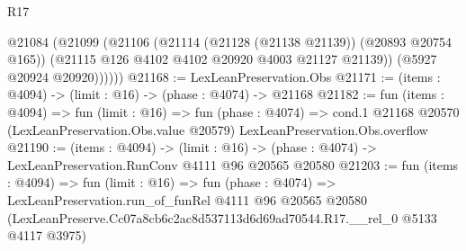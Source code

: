 \begin{lexlean}{R17}
\begin{coremodule}
          @21084
            (@21099
              (@21106
                (@21114 (@21128 (@21138 @21139)) (@20893 @20754 @165))
                (@21115 @126 @4102 @4102 @20920 @4003 @21127 @21139))
              (@5927 @20924 @20920))))))
@21168 := LexLeanPreservation.Obs
@21171 := (items : @4094) -> (limit : @16) -> (phase : @4074) -> @21168
@21182 := fun (items : @4094) =>
  fun (limit : @16) =>
  fun (phase : @4074) =>
  cond.{1} @21168 @20570 (LexLeanPreservation.Obs.value @20579) LexLeanPreservation.Obs.overflow
@21190 := (items : @4094) ->
  (limit : @16) -> (phase : @4074) -> LexLeanPreservation.RunConv @4111 @96 @20565 @20580
@21203 := fun (items : @4094) =>
  fun (limit : @16) =>
  fun (phase : @4074) =>
  LexLeanPreservation.run_of_funRel
    @4111
    @96
    @20565
    @20580
    (LexLeanPreserve.Cc07a8cb6c2ac8d537113d6d69ad70544.R17.__rel_0 @5133 @4117 @3975)
\end{coremodule}
\end{lexlean}
